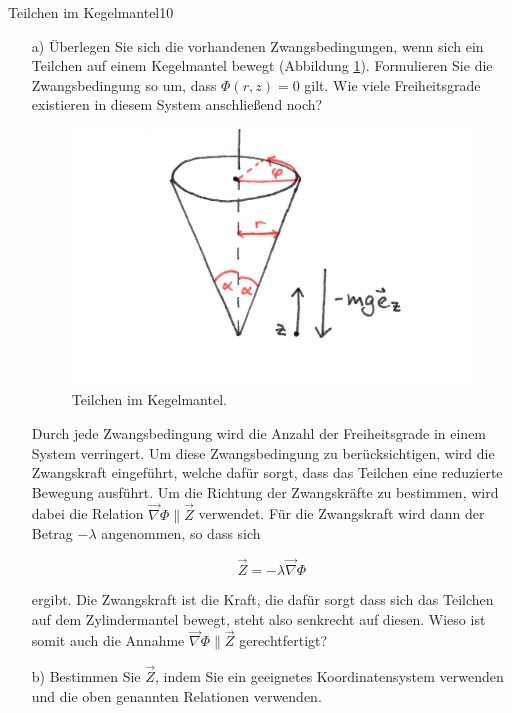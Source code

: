 \begin{exercise}{Teilchen im Kegelmantel}{10}


  \begin{enumerate}
    \item[a)] Überlegen Sie sich die vorhandenen Zwangsbedingungen, wenn sich ein
    Teilchen auf einem Kegelmantel bewegt (Abbildung \ref{fig:TiK}).
    Formulieren Sie die Zwangsbedingung
    so um, dass $\Phi(r,z) = 0$ gilt. Wie viele Freiheitsgrade existieren
    in diesem System anschlie\ss{}end noch?

    \FloatBarrier
    \begin{figure}
      \centering
      \includegraphics[width = 7 cm]{Kegel.jpg}
      \caption{Teilchen im Kegelmantel.}
      \label{fig:TiK}
    \end{figure}

    \item[\bullet]Durch jede Zwangsbedingung wird die Anzahl der Freiheitsgrade in einem System
    verringert. Um diese Zwangsbedingung zu berücksichtigen, wird die Zwangskraft
    eingeführt, welche dafür sorgt, dass das Teilchen eine reduzierte Bewegung
    ausführt. Um die Richtung der Zwangskräfte zu bestimmen, wird dabei
    die Relation $ \vec{\nabla} \Phi \parallel \vec{Z}$ verwendet. Für die
    Zwangskraft wird dann der Betrag $-\lambda$ angenommen, so dass sich

    \begin{equation}
      \vec{Z} = - \lambda \vec{\nabla} \Phi
    \end{equation}

    ergibt. Die Zwangskraft ist die Kraft, die dafür sorgt dass sich das Teilchen
    auf dem Zylindermantel bewegt, steht also senkrecht auf diesen. Wieso ist
    somit auch die Annahme $ \vec{\nabla} \Phi \parallel \vec{Z}$ gerechtfertigt?

    \item[b)] Bestimmen Sie $\vec{Z}$, indem Sie ein geeignetes Koordinatensystem
    verwenden und die oben genannten Relationen verwenden.


\end{enumerate}
\end{exercise}
